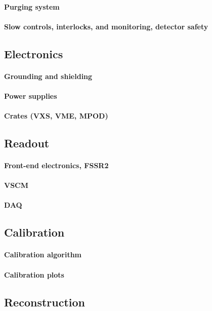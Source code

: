 \paragraph{Purging system}
\paragraph{Slow controls, interlocks, and monitoring, detector safety}
\subsection{Electronics}
\paragraph{Grounding and shielding}
\paragraph{Power supplies}
\paragraph{Crates (VXS, VME, MPOD)}
\subsection{Readout}
\paragraph{Front-end electronics, FSSR2}
\paragraph{VSCM}
\paragraph{DAQ}
\subsection{Calibration}
\paragraph{Calibration algorithm}
\paragraph{Calibration plots}
\subsection{Reconstruction}
